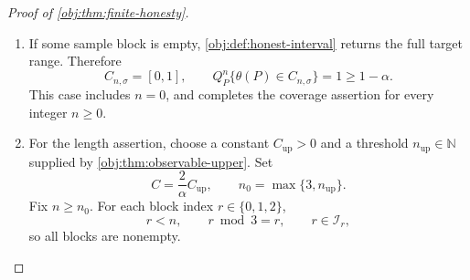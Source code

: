 \documentclass[11pt]{article}
\begin{document}
\begin{proof}[Proof of \cref{obj:thm:finite-honesty}]
\begin{enumerate}
Define the measurable event
\[
\mathcal G_{\mathrm{cover}}
=
\left\{\text{data}:
|\widehat\theta-\theta(P)|\le A_{\widehat q}(K)/\alpha\right\}.
\]
Markov's inequality and the certificate give
\[
A_{\widehat q}(K)/\alpha\,
Q_P^n\!\left\{
A_{\widehat q}(K)/\alpha\le|\widehat\theta-\theta(P)|
\right\}
\le
E_{Q_P^n}|\widehat\theta-\theta(P)|
\le A_{\widehat q}(K).
\]
Because \(A_{\widehat q}(K)>0\) and \(\alpha>0\), and the complement of
\(\mathcal G_{\mathrm{cover}}\) is contained in the displayed upper-tail event,
\[
Q_P^n(\mathcal G_{\mathrm{cover}}^c)
\le
Q_P^n\!\left\{
A_{\widehat q}(K)/\alpha\le|\widehat\theta-\theta(P)|
\right\}
\le\alpha,
\qquad
Q_P^n(\mathcal G_{\mathrm{cover}})\ge1-\alpha.
\]
On \(\mathcal G_{\mathrm{cover}}\),
\[
\widehat\theta-A_{\widehat q}(K)/\alpha
\le\theta(P)
\le\widehat\theta+A_{\widehat q}(K)/\alpha.
\]
Combining these inequalities with the target range gives
\[
\max\!\left\{0,\widehat\theta-A_{\widehat q}(K)/\alpha\right\}
\le\theta(P)
\le
\min\!\left\{1,\widehat\theta+A_{\widehat q}(K)/\alpha\right\}.
\]
Thus \cref{obj:def:honest-interval} implies
\[
Q_P^n\{\theta(P)\in C_{n,\sigma}\}
\ge Q_P^n(\mathcal G_{\mathrm{cover}})
\ge1-\alpha.
\]

\item If some sample block is empty, \cref{obj:def:honest-interval} returns the full target range. Therefore
\[
C_{n,\sigma}=[0,1],
\qquad
Q_P^n\{\theta(P)\in C_{n,\sigma}\}=1\ge1-\alpha.
\]
This case includes \(n=0\), and completes the coverage assertion for every integer \(n\ge0\).

\item For the length assertion, choose a constant \(C_{\mathrm{up}}>0\) and a threshold \(n_{\mathrm{up}}\in\mathbb N\) supplied by \cref{obj:thm:observable-upper}. Set
\[
C=\frac{2}{\alpha}C_{\mathrm{up}},
\qquad
n_0=\max\{3,n_{\mathrm{up}}\}.
\]
Fix \(n\ge n_0\). For each block index \(r\in\{0,1,2\}\),
\[
r<n,\qquad r\bmod3=r,\qquad r\in\mathcal I_r,
\]
so all blocks are nonempty.


\end{enumerate}
\end{proof}
\end{document}
